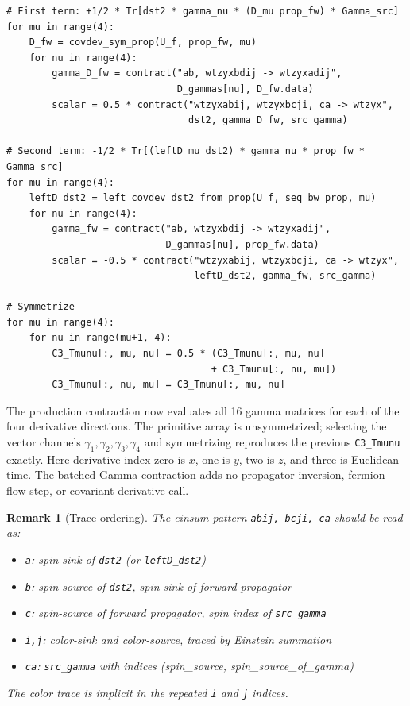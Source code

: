 \documentclass[11pt,a4paper]{article}
\newtheorem{remark}{Remark}
\newcommand{\code}[1]{\texttt{#1}}
\begin{document}
\begin{verbatim}
# First term: +1/2 * Tr[dst2 * gamma_nu * (D_mu prop_fw) * Gamma_src]
for mu in range(4):
    D_fw = covdev_sym_prop(U_f, prop_fw, mu)
    for nu in range(4):
        gamma_D_fw = contract("ab, wtzyxbdij -> wtzyxadij",
                              D_gammas[nu], D_fw.data)
        scalar = 0.5 * contract("wtzyxabij, wtzyxbcji, ca -> wtzyx",
                                dst2, gamma_D_fw, src_gamma)

# Second term: -1/2 * Tr[(leftD_mu dst2) * gamma_nu * prop_fw * Gamma_src]
for mu in range(4):
    leftD_dst2 = left_covdev_dst2_from_prop(U_f, seq_bw_prop, mu)
    for nu in range(4):
        gamma_fw = contract("ab, wtzyxbdij -> wtzyxadij",
                            D_gammas[nu], prop_fw.data)
        scalar = -0.5 * contract("wtzyxabij, wtzyxbcji, ca -> wtzyx",
                                 leftD_dst2, gamma_fw, src_gamma)

# Symmetrize
for mu in range(4):
    for nu in range(mu+1, 4):
        C3_Tmunu[:, mu, nu] = 0.5 * (C3_Tmunu[:, mu, nu]
                                    + C3_Tmunu[:, nu, mu])
        C3_Tmunu[:, nu, mu] = C3_Tmunu[:, mu, nu]
\end{verbatim}

The production contraction now evaluates all 16 gamma matrices for each of the
four derivative directions.  The primitive array is unsymmetrized; selecting
the vector channels $\gamma_1,\gamma_2,\gamma_3,\gamma_4$ and symmetrizing
reproduces the previous \code{C3\_Tmunu} exactly.  Here derivative index zero is
$x$, one is $y$, two is $z$, and three is Euclidean time.  The batched Gamma
contraction adds no propagator inversion, fermion-flow step, or covariant
derivative call.

\begin{remark}[Trace ordering]
The einsum pattern \code{abij, bcji, ca} should be read as:
\begin{itemize}[nosep]
  \item \code{a}: spin-sink of \code{dst2} (or \code{leftD\_dst2})
  \item \code{b}: spin-source of \code{dst2}, spin-sink of forward propagator
  \item \code{c}: spin-source of forward propagator, spin index of \code{src\_gamma}
  \item \code{i,j}: color-sink and color-source, traced by Einstein summation
  \item \code{ca}: \code{src\_gamma} with indices (spin\_source, spin\_source\_of\_gamma)
\end{itemize}
The color trace is implicit in the repeated \code{i} and \code{j} indices.
\end{remark}
\end{document}
